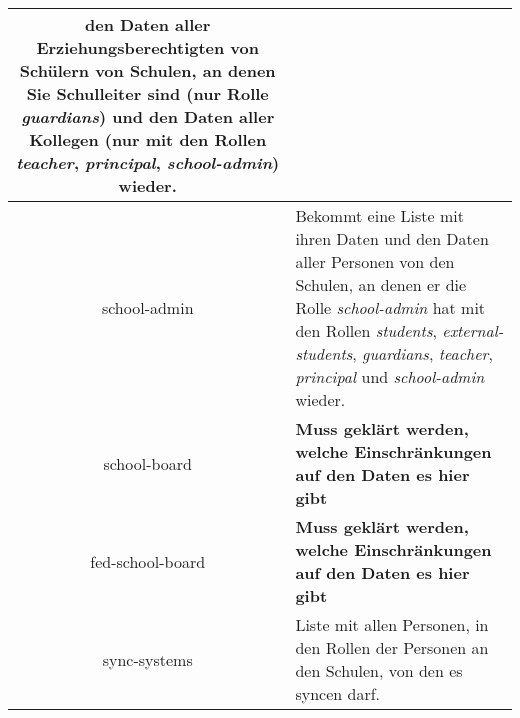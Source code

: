 \begin{longtable}{|c|p{}|}
						den Daten aller Erziehungsberechtigten von Schülern von Schulen, an denen Sie Schulleiter sind (nur Rolle \textit{guardians}) und
					  den Daten aller Kollegen (nur mit den Rollen \textit{teacher}, \textit{principal}, \textit{school-admin})
						wieder.\\ \hline
school-admin & Bekommt eine Liste mit ihren Daten und
               den Daten aller Personen von den Schulen, an denen er die Rolle \textit{school-admin} hat mit den Rollen \textit{students}, \textit{external-students}, \textit{guardians}, \textit{teacher}, \textit{principal} und \textit{school-admin} wieder.  \\ \hline
school-board & \textcolor[rgb]{1,0.41,0.13}{\textbf{Muss geklärt werden, welche Einschränkungen auf den Daten es hier gibt}} \\ \hline
fed-school-board & \textcolor[rgb]{1,0.41,0.13}{\textbf{Muss geklärt werden, welche Einschränkungen auf den Daten es hier gibt}} \\ \hline
sync-systems & Liste mit allen Personen, in den Rollen der Personen an den Schulen, von den es syncen darf. \\ \hline
	\end{longtable}
